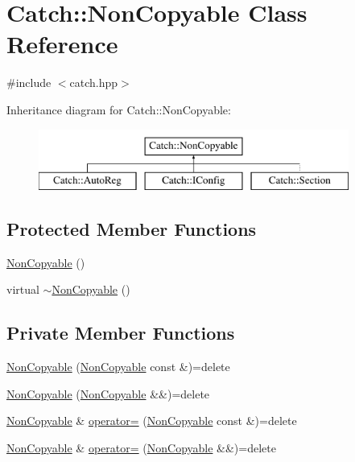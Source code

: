 \hypertarget{class_catch_1_1_non_copyable}{}\section{Catch\+::Non\+Copyable Class Reference}
\label{class_catch_1_1_non_copyable}


{\ttfamily \#include $<$catch.\+hpp$>$}

Inheritance diagram for Catch\+::Non\+Copyable\+:\begin{figure}[H]
\begin{center}
\leavevmode
\includegraphics[height=2.000000cm]{class_catch_1_1_non_copyable}
\end{center}
\end{figure}
\subsection*{Protected Member Functions}
\begin{DoxyCompactItemize}
\item 
\mbox{\hyperlink{class_catch_1_1_non_copyable_a4b492dd5753f9952350fb64dc6cb9fe2}{Non\+Copyable}} ()
\item 
virtual \mbox{\hyperlink{class_catch_1_1_non_copyable_a81254677280fef337eb4a676e91e3293}{$\sim$\+Non\+Copyable}} ()
\end{DoxyCompactItemize}
\subsection*{Private Member Functions}
\begin{DoxyCompactItemize}
\item 
\mbox{\hyperlink{class_catch_1_1_non_copyable_a74cf3e4aa051c284941e39b436b2f693}{Non\+Copyable}} (\mbox{\hyperlink{class_catch_1_1_non_copyable}{Non\+Copyable}} const \&)=delete
\item 
\mbox{\hyperlink{class_catch_1_1_non_copyable_a09d1d8775db8c495fa40c285b034faa3}{Non\+Copyable}} (\mbox{\hyperlink{class_catch_1_1_non_copyable}{Non\+Copyable}} \&\&)=delete
\item 
\mbox{\hyperlink{class_catch_1_1_non_copyable}{Non\+Copyable}} \& \mbox{\hyperlink{class_catch_1_1_non_copyable_a958b5f57d45fdd6f418bec8b46a629ab}{operator=}} (\mbox{\hyperlink{class_catch_1_1_non_copyable}{Non\+Copyable}} const \&)=delete
\item 
\mbox{\hyperlink{class_catch_1_1_non_copyable}{Non\+Copyable}} \& \mbox{\hyperlink{class_catch_1_1_non_copyable_a317697b6d3c4cda093666ce61d3a1e31}{operator=}} (\mbox{\hyperlink{class_catch_1_1_non_copyable}{Non\+Copyable}} \&\&)=delete
\end{DoxyCompactItemize}


